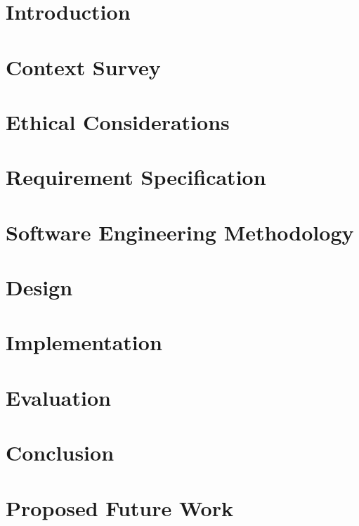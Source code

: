 \documentclass[
11pt, %
oneside, %
english, %
singlespacing, %
liststotoc, %
toctotoc, %
parskip, %
headsepline, %
]{MastersDoctoralThesis} %
\newcommand{\chapterinput}[1]{}
\begin{document}
\chapter{Introduction}
\chapterinput{introduction.tex}

\chapter{Context Survey}
\chapterinput{context_survey.tex}

\chapter{Ethical Considerations}
\chapterinput{ethics.tex}

\chapter{Requirement Specification}
\chapterinput{requirements.tex}

\chapter{Software Engineering Methodology}
\chapterinput{software_engineering.tex}

\chapter{Design}
\chapterinput{design.tex}

\chapter{Implementation}
\chapterinput{implementation.tex}

\chapter{Evaluation}
\chapterinput{evaluation.tex}

\chapter{Conclusion}
\chapterinput{conclusion.tex}

\chapter{Proposed Future Work}
\chapterinput{future.tex}

\end{document}

